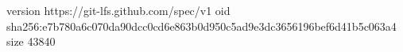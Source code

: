 version https://git-lfs.github.com/spec/v1
oid sha256:e7b780a6c070da90dcc0cd6e863b0d950c5ad9e3dc3656196bef6d41b5c063a4
size 43840
